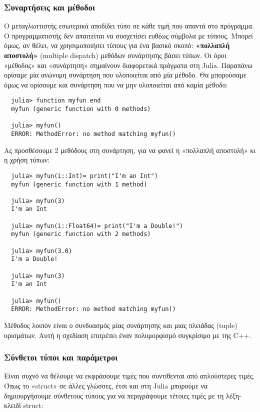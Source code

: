   \subsubsection{Συναρτήσεις και μέθοδοι}

  Ο μεταγλωττιστής εσωτερικά αποδίδει τύπο σε κάθε τιμή που απαντά στο πρόγραμμα.
  Ο προγραμματιστής δεν απαιτείται να συσχετίσει ευθέως σύμβολα με τύπους.
  Μπορεί όμως, αν θέλει, να χρησιμοποιήσει τύπους για ένα βασικό σκοπό:
  \textbf{«πολλαπλή αποστολή»} (multiple dispatch) μεθόδων συνάρτησης βάσει τύπων.
  Οι όροι «μέθοδος» και «συνάρτηση» σημαίνουν διαφορετικά πράγματα στη Julia. Παραπάνω ορίσαμε μία ανώνυμη συνάρτηση που υλοποιείται από μία μέθοδο.
  Θα μπορούσαμε όμως να ορίσουμε και συνάρτηση που να μην υλοποιείται από καμία μέθοδο:
  \begin{verbatim}
  julia> function myfun end
  myfun (generic function with 0 methods)

  julia> myfun()
  ERROR: MethodError: no method matching myfun()
  \end{verbatim}

  Ας προσθέσουμε 2 μεθόδους στη συνάρτηση, για να φανεί η «πολλαπλή αποστολή» κι η χρήση τύπων:
  \begin{verbatim}
  julia> myfun(i::Int)= print("I'm an Int")
  myfun (generic function with 1 method)

  julia> myfun(3)
  I'm an Int

  julia> myfun(i::Float64)= print("I'm a Double!")
  myfun (generic function with 2 methods)

  julia> myfun(3.0)
  I'm a Double!

  julia> myfun(3)
  I'm an Int

  julia> myfun()
  ERROR: MethodError: no method matching myfun()
  \end{verbatim}

  Μέθοδος λοιπόν είναι ο συνδυασμός μίας συνάρτησης και μιας πλειάδας (tuple) ορισμάτων.
  Αυτή η σχεδίαση επιτρέπει έναν πολυμορφισμό συγκρίσιμο με της C++.

  \subsubsection{Σύνθετοι τύποι και παράμετροι} \label{intro:julia_struct}

  Είναι συχνό να θέλουμε να εκφράσουμε τιμές που συντίθενται από απλούστερες τιμές.
  Όπως το «struct» σε άλλες γλώσσες, έτσι και στη Julia μπορούμε να δημιουργήσουμε σύνθετους τύπους για να περιγράψουμε τέτοιες τιμές με τη λέξη-κλειδί struct:

